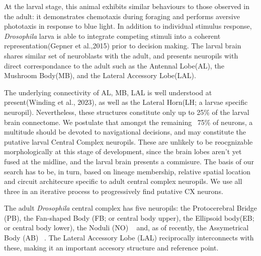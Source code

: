 \documentclass{article}
\begin{document}
At the larval stage, this animal exhibits  similar behaviours to those observed in the adult: it demonstrates chemotaxis during foraging and performs aversive phototaxis in response to blue light. In addition to individual stimulus response, \textit{Drosophila} larva is able to integrate competing stimuli into a coherent representation(Gepner et al.,2015) prior to decision making. The larval brain shares similar set of neuroblasts with the adult, and presents neuropils with direct correspondance to the adult such as the Antennal Lobe(AL), the Mushroom Body(MB), and the Lateral Accessory Lobe(LAL). 

The underlying connectivity of AL, MB, LAL is well understood at present(Winding et al., 2023), as well as the Lateral Horn(LH; a larvae specific neuropil). Nevertheless, these structures constitute only up to 25\% of the larval brain connectome. We postulate that amongst the remaining ~75\% of neurons, a multitude should be devoted to navigational decisions, and may constitute the putative larval Central Complex neuropils. These are unlikely to be reocgnizable morphologically at this stage of development, since the brain lobes aren't yet fused at the midline, and the larval brain presents a commisure. The basis of our search has to be, in turn, based on lineage membership, relative spatial location and circuit architecure specific to adult central complex neuropils. We use all three in an iterative process to progressively find putative CX neurons.


The adult \textit{\textit{Drosophila}} central complex has five neuropils: the Protocerebral Bridge (PB), the Fan-shaped Body (FB; or central body upper), the Ellipsoid body(EB; or central body lower), the Noduli (NO) ~\citep{hanesch1989neuronal} and, as of recently, the Assymetrical Body (AB) ~\citep{wolff2018neuroarchitecture}. The Lateral Accessory Lobe (LAL) reciprocally interconnects with these, making it an important accesory structure and reference point. 
\end{document}
